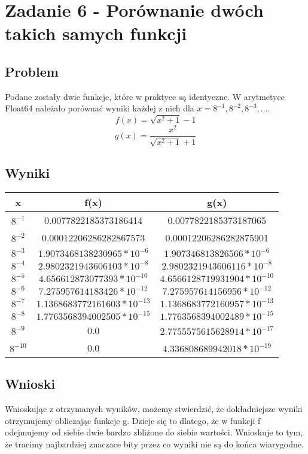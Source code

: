 \documentclass[12pt, a4paper]{article}
\begin{document}
\section{Zadanie 6 - Porównanie dwóch takich samych funkcji}
\subsection{Problem}
Podane zostały dwie funkcje, które w praktyce są identyczne. W arytmetyce Float64 należało porównać wyniki każdej z nich dla $x = 8^{-1}, 8^{-2}, 8^{-3},...$.
\[ f(x) = \sqrt{x^2 + 1} - 1 \]
\[ g(x) = \frac{x^2}{\sqrt{x^2 + 1} + 1} \]
\subsection{Wyniki}
\begin{center}
  \begin{tabular}{c|c|c}
    x & f(x) & g(x)\\
    \hline
    $8^{-1}$ & 0.0077822185373186414 & 0.0077822185373187065 \\
    $8^{-2}$ & 0.00012206286282867573 & 0.00012206286282875901 \\
    $8^{-3}$ & $1.9073468138230965 * 10^{-6}$ & $1.907346813826566 * 10^{-6}$ \\
    $8^{-4}$ & $2.9802321943606103 * 10^{-8}$ & $2.9802321943606116 * 10^{-8}$ \\
    $8^{-5}$ & $4.656612873077393 * 10^{-10}$ & $4.6566128719931904 * 10^{-10}$ \\
    $8^{-6}$ & $7.275957614183426 * 10^{-12}$ & $7.275957614156956 * 10^{-12}$ \\
    $8^{-7}$ & $1.1368683772161603 * 10^{-13}$ & $1.1368683772160957 * 10^{-13}$\\
    $8^{-8}$ & $1.7763568394002505 * 10^{-15}$ & $1.7763568394002489 * 10^{-15}$\\
    $8^{-9}$ & 0.0 & $2.7755575615628914 * 10^{-17}$\\
    $8^{-10}$ & 0.0 & $4.336808689942018 * 10^{-19}$
  \end{tabular}
\end{center}
\subsection{Wnioski}
Wnioskując z otrzymanych wyników, możemy stwierdzić, że dokładniejsze wyniki otrzymujemy obliczając funkcje g. Dzieje się to dlatego, że w funkcji f odejmujemy od siebie dwie bardzo zbliżone do siebie wartości. Wnioskuje to tym, że tracimy najbardziej znaczace bity przez co wyniki nie są do końca wiarygodne.
\end{document}
